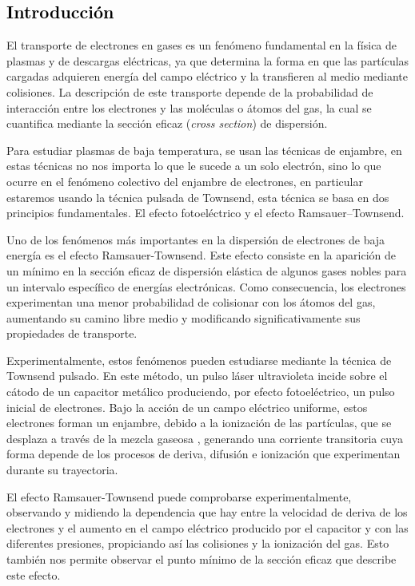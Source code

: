 \textcolor{black}{\section{Introducción}}

El transporte de electrones en gases es un fenómeno fundamental en la física de plasmas y de descargas eléctricas, ya que determina la forma en que las partículas cargadas adquieren energía del campo eléctrico y la transfieren al medio mediante colisiones. La descripción de este transporte depende de la probabilidad de interacción entre los electrones y las moléculas o átomos del gas, la cual se cuantifica mediante la sección eficaz (\textit{cross section}) de dispersión. \cite{Urquijo}

Para estudiar plasmas de baja temperatura, se usan las técnicas de enjambre, en estas técnicas no nos importa lo que le sucede a un solo electrón, sino lo que ocurre en el fenómeno colectivo del enjambre de electrones, en particular estaremos usando la técnica pulsada de Townsend, esta técnica se basa en dos principios fundamentales. El efecto fotoeléctrico y el efecto Ramsauer--Townsend.

Uno de los fenómenos más importantes en la dispersión de electrones de baja energía es el efecto Ramsauer-Townsend. Este efecto consiste en la aparición de un mínimo en la sección eficaz de dispersión elástica de algunos gases nobles para un intervalo específico de energías electrónicas. Como consecuencia, los electrones experimentan una menor probabilidad de colisionar con los átomos del gas, aumentando su camino libre medio y modificando significativamente sus propiedades de transporte. \cite{Olmo}

Experimentalmente, estos fenómenos pueden estudiarse mediante la técnica de Townsend pulsado. En este método, un pulso láser ultravioleta incide sobre el cátodo de un capacitor metálico produciendo, por efecto fotoeléctrico, un pulso inicial de electrones. Bajo la acción de un campo eléctrico uniforme, estos electrones forman un enjambre, debido a la ionización de las partículas, que se desplaza a través de la mezcla gaseosa , generando una corriente transitoria cuya forma depende de los procesos de deriva, difusión e ionización que experimentan durante su trayectoria. \cite{Olmo}

El efecto Ramsauer-Townsend puede comprobarse experimentalmente, observando y midiendo la dependencia que hay entre la velocidad de deriva de los electrones y el aumento en el campo eléctrico producido por el capacitor y con las diferentes presiones, propiciando así las colisiones y la ionización del gas. Esto también nos permite observar el punto mínimo de la sección eficaz que describe este efecto. \cite{Swarm}
\noindent 